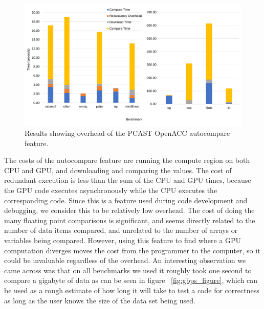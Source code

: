 
\begin{figure}[t]
    \centering
    \includegraphics [width=1\linewidth] {npic3.pdf}
    \caption{Results showing overhead of the PCAST OpenACC autocompare feature.}
    \label{fig:sle_figure}
\end{figure}


The costs of the autocompare feature are running the compute region on both CPU and GPU, and downloading and comparing the values.
The cost of redundant execution is less than the sum of the CPU and GPU times, because the GPU code executes asynchronously while the CPU executes the corresponding code.
Since this is a feature used during code development and debugging, we consider this to be relatively low overhead.
The cost of doing the many floating point comparisons is significant, and seems directly related to the number of data items compared, and unrelated to the number of arrays or variables being compared.
However, using this feature to find where a GPU computation diverges moves the cost from the programmer to the computer, so it could be invaluable regardless of the overhead. An interesting observation we came across was that on all benchmarks we used it roughly took one second to compare a gigabyte of data as can be seen in figure ~\ref{fig:gbps_figure}, which can be used as a rough estimate of how long it will take to test a code for correctness as long as the user knows the size of the data set being used.

